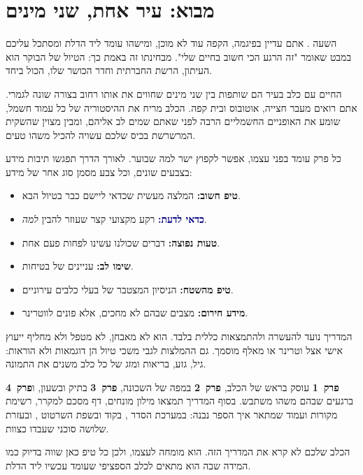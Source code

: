\chapter*{מבוא: עיר אחת, שני מינים}
\thispagestyle{plain}

השעה . אתם עדיין בפיג\gr מה, הקפה עוד לא מוכן, ומישהו עומד ליד הדלת ומסתכל עליכם במבט שאומר
"זה הרגע הכי חשוב בחיים שלי". מבחינתו זה באמת כך: הטיול של הבוקר הוא העיתון, הרשת החברתית
וחדר הכושר שלו, הכול ביחד.

החיים עם כלב בעיר הם שותפות בין שני מינים שחווים את אותו רחוב בצורה שונה לגמרי. אתם רואים
מעבר חצייה, אוטובוס ובית קפה. הכלב מריח את ההיסטוריה של כל עמוד חשמל, שומע את האופניים החשמליים
הרבה לפני שאתם שמים לב אליהם, ומבין מצוין שהשקית המרשרשת בכיס שלכם עשויה להכיל משהו טעים.

כל פרק עומד בפני עצמו, אפשר לקפוץ ישר למה שבוער. לאורך הדרך תפגשו תיבות מידע בצבעים שונים,
וכל צבע מסמן סוג אחר של מידע:

\begin{itemize}
  \item \textcolor{sagedark}{\textbf{טיפ חשוב:}} המלצה מעשית שכדאי ליישם כבר בטיול הבא.
  \item \textcolor{navy}{\textbf{כדאי לדעת:}} רקע מקצועי קצר שעוזר להבין \emph{למה}.
  \item \textcolor{coraldark}{\textbf{טעות נפוצה:}} דברים שכולנו עשינו לפחות פעם אחת.
  \item \textcolor{golddark}{\textbf{שימו לב:}} עניינים של בטיחות.
  \item \textcolor{sagedark}{\textbf{טיפ מהשטח:}} הניסיון המצטבר של בעלי כלבים עירוניים.
  \item \textcolor{alert}{\textbf{מידע חירום:}} מצבים שבהם לא מחכים, אלא פונים לווטרינר.
\end{itemize}

\begin{notebox}
המדריך נועד להעשרה ולהתמצאות כללית בלבד. הוא לא מאבחן, לא מטפל ולא מחליף ייעוץ אישי אצל
וטרינר או מאלף מוסמך. גם ההמלצות לגבי משכי טיול הן דוגמאות ולא הוראות: גיל, גזע, בריאות ומזג
של כל כלב משנים את התמונה.
\end{notebox}

\textbf{פרק~1} עוסק בראש של הכלב, \textbf{פרק~2} במפה של השכונה, \textbf{פרק~3} בתיק ובשעון,
ו\textbf{פרק~4} ברגעים שבהם משהו משתבש. בסוף המדריך תמצאו מילון מונחים, דף מסכם למקרר,
רשימת מקורות ועמוד שמתאר איך הספר נבנה: במערכת הסדר , בקוד  ובשפת השרטוט
, ובעזרת שלושה סוכני  שעבדו כצוות.

\begin{fieldbox}
הכלב שלכם לא קרא את המדריך הזה. הוא מומחה לעצמו, ולכן כל טיפ כאן שווה בדיוק כמו המידה שבה הוא
מתאים לכלב הספציפי שעומד עכשיו ליד הדלת.
\end{fieldbox}
\clearpage
